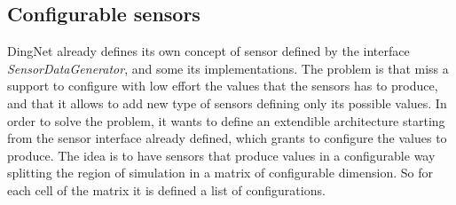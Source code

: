 \subsection*{Configurable sensors}
DingNet already defines its own concept of sensor defined by the interface \mbox{\textit{SensorDataGenerator}}, and some its implementations.
The problem is that miss a support to configure with low effort the values that the sensors has to produce, and that it allows to add new type of sensors defining only its possible values.
In order to solve the problem, it wants to define an extendible architecture starting from the sensor interface already defined, which grants to configure the values to produce.
The idea is to have sensors that produce values in a configurable way splitting the region of simulation in a matrix of configurable dimension.
So for each cell of the matrix it is defined a list of configurations. 


